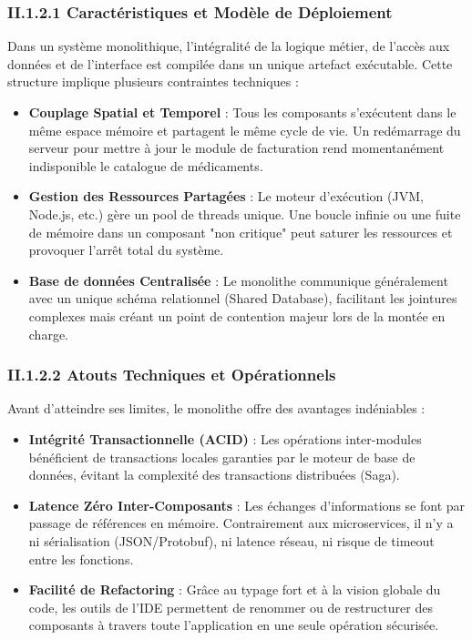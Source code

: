 \subsubsection{II.1.2.1 Caractéristiques et Modèle de Déploiement}
Dans un système monolithique, l'intégralité de la logique métier, de l'accès aux données et de l'interface est compilée dans un unique artefact exécutable. Cette structure implique plusieurs contraintes techniques :
\begin{itemize}
    \item \textbf{Couplage Spatial et Temporel} : Tous les composants s'exécutent dans le même espace mémoire et partagent le même cycle de vie. Un redémarrage du serveur pour mettre à jour le module de facturation rend momentanément indisponible le catalogue de médicaments.
    \item \textbf{Gestion des Ressources Partagées} : Le moteur d'exécution (JVM, Node.js, etc.) gère un pool de threads unique. Une boucle infinie ou une fuite de mémoire dans un composant "non critique" peut saturer les ressources et provoquer l'arrêt total du système.
    \item \textbf{Base de données Centralisée} : Le monolithe communique généralement avec un unique schéma relationnel (Shared Database), facilitant les jointures complexes mais créant un point de contention majeur lors de la montée en charge.
\end{itemize}

\subsubsection{II.1.2.2 Atouts Techniques et Opérationnels}
Avant d'atteindre ses limites, le monolithe offre des avantages indéniables :
\begin{itemize}
    \item \textbf{Intégrité Transactionnelle (ACID)} : Les opérations inter-modules bénéficient de transactions locales garanties par le moteur de base de données, évitant la complexité des transactions distribuées (Saga).
    \item \textbf{Latence Zéro Inter-Composants} : Les échanges d'informations se font par passage de références en mémoire. Contrairement aux microservices, il n'y a ni sérialisation (JSON/Protobuf), ni latence réseau, ni risque de timeout entre les fonctions.
    \item \textbf{Facilité de Refactoring} : Grâce au typage fort et à la vision globale du code, les outils de l'IDE permettent de renommer ou de restructurer des composants à travers toute l'application en une seule opération sécurisée.
\end{itemize}

